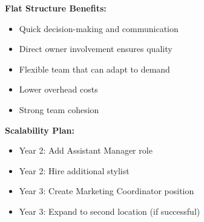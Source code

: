 \vspace{1em}

\begin{tcolorbox}[mybox, title=\textbf{Organizational Design Rationale}]
\textbf{Flat Structure Benefits:}
\begin{itemize}[leftmargin=1em, itemsep=0pt]
    \item Quick decision-making and communication
    \item Direct owner involvement ensures quality
    \item Flexible team that can adapt to demand
    \item Lower overhead costs
    \item Strong team cohesion
\end{itemize}

\textbf{Scalability Plan:}
\begin{itemize}[leftmargin=1em, itemsep=0pt]
    \item Year 2: Add Assistant Manager role
    \item Year 2: Hire additional stylist
    \item Year 3: Create Marketing Coordinator position
    \item Year 3: Expand to second location (if successful)
\end{itemize}
\end{tcolorbox}

